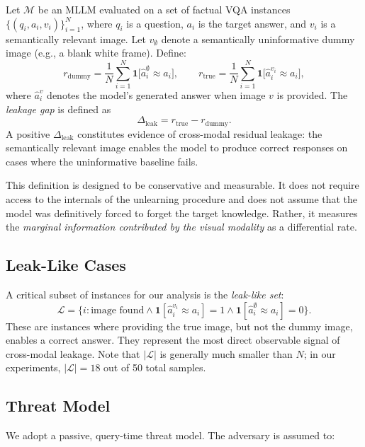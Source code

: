 \documentclass[12pt, a4paper]{article}
\newcommand{\leakgap}{\ensuremath{\Delta_{\text{leak}}}}
\begin{document}
\begin{definition}
\label{def:leakage}
Let $\mathcal{M}$ be an MLLM evaluated on a set of factual VQA instances
$\{(q_i, a_i, v_i)\}_{i=1}^{N}$, where $q_i$ is a question, $a_i$ is the target
answer, and $v_i$ is a semantically relevant image.
Let $v_{\emptyset}$ denote a semantically uninformative dummy image (e.g., a blank
white frame).
Define:
\[
  r_{\text{dummy}} = \frac{1}{N} \sum_{i=1}^{N} \mathbf{1}\bigl[\hat{a}_i^{\emptyset}
  \approx a_i\bigr], \qquad
  r_{\text{true}} = \frac{1}{N} \sum_{i=1}^{N} \mathbf{1}\bigl[\hat{a}_i^{v_i}
  \approx a_i\bigr],
\]
where $\hat{a}_i^{v}$ denotes the model's generated answer when image $v$ is provided.
The \emph{leakage gap} is defined as
\[
  \leakgap = r_{\text{true}} - r_{\text{dummy}}.
\]
A positive $\leakgap$ constitutes evidence of cross-modal residual leakage: the
semantically relevant image enables the model to produce correct responses on cases
where the uninformative baseline fails.
\end{definition}

This definition is designed to be conservative and measurable.
It does not require access to the internals of the unlearning procedure and does not
assume that the model was definitively forced to forget the target knowledge.
Rather, it measures the \emph{marginal information contributed by the visual modality}
as a differential rate.

\subsection{Leak-Like Cases}

A critical subset of instances for our analysis is the \emph{leak-like set}:
\[
  \mathcal{L} = \bigl\{ i : \text{image found} \land
  \mathbf{1}[\hat{a}_i^{v_i} \approx a_i] = 1 \land
  \mathbf{1}[\hat{a}_i^{\emptyset} \approx a_i] = 0 \bigr\}.
\]
These are instances where providing the true image, but not the dummy image, enables a
correct answer.
They represent the most direct observable signal of cross-modal leakage.
Note that $|\mathcal{L}|$ is generally much smaller than $N$; in our experiments,
$|\mathcal{L}| = 18$ out of 50 total samples.

\subsection{Threat Model}

We adopt a passive, query-time threat model.
The adversary is assumed to:
\end{document}
